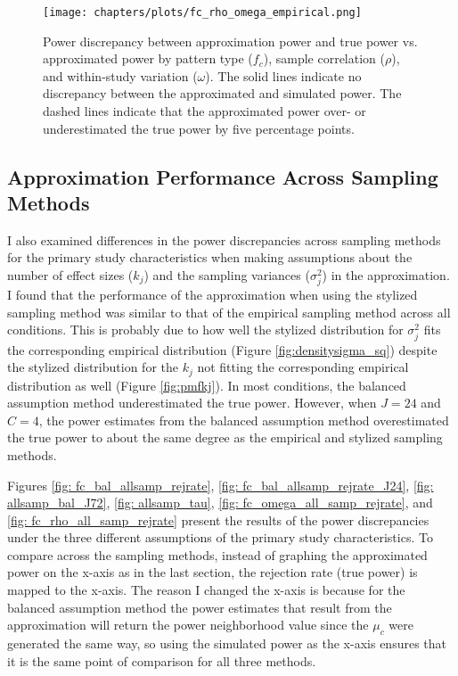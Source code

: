 \begin{figure}
    \centering
    \vspace{-5pt}\texttt{[image: chapters/plots/fc\_rho\_omega\_empirical.png]}\caption{Power discrepancy between approximation power and true power vs. approximated power by pattern type ($f_c$), sample correlation ($\rho$), and within-study variation ($\omega$). The solid lines indicate no discrepancy between the approximated and simulated power. The dashed lines indicate that the approximated power over- or underestimated the true power by five percentage points.}
    \label{fig: fc_rho_omega_empirical}
    \vspace{-5pt}
\end{figure}


\subsection{Approximation Performance Across Sampling Methods}

I also examined differences in the power discrepancies across sampling methods for the primary study characteristics when making assumptions about the number of effect sizes ($k_j$) and the sampling variances ($\sigma_j^2$) in the approximation. I found that the performance of the approximation when using the stylized sampling method was similar to that of the empirical sampling method across all conditions. 
This is probably due to how well the stylized distribution for $\sigma_j^2$ fits the corresponding empirical distribution (Figure \ref{fig:densitysigma_sq}) despite the stylized distribution for the $k_j$ not fitting the corresponding empirical distribution as well (Figure \ref{fig:pmfkj}). In most conditions, the balanced assumption method underestimated the true power. However, when $J=24$ and $C=4$, the power estimates from the balanced assumption method overestimated the true power to about the same degree as the empirical and stylized sampling methods.

Figures \ref{fig: fc_bal_allsamp_rejrate}, \ref{fig: fc_bal_allsamp_rejrate_J24}, \ref{fig: allsamp_bal_J72}, \ref{fig: allsamp_tau}, \ref{fig: fc_omega_all_samp_rejrate}, and \ref{fig: fc_rho_all_samp_rejrate} present the results of the power discrepancies under the three different assumptions of the primary study characteristics. To compare across the sampling methods, instead of graphing the approximated power on the x-axis as in the last section, the rejection rate (true power) is mapped to the x-axis. The reason I changed the x-axis is because for the balanced assumption method the power estimates that result from the approximation will return the power neighborhood value since the $\mu_c$ were generated the same way, so using the simulated power as the x-axis ensures that it is the same point of comparison for all three methods. 


